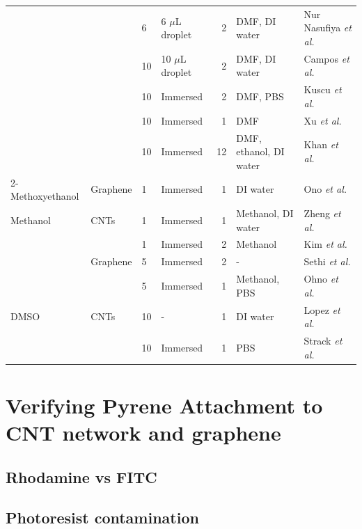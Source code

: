 \documentclass[
  a4paper,
]{scrbook}
\begin{document}
\begin{longtable}[]{@{}llllrll@{}}
& & 6 & 6 \(\mu\)L droplet & 2 & DMF, DI water & Nur Nasufiya
\textit{et al.} \cite{NurNasyifa2020} \\
& & 10 & 10 \(\mu\)L droplet & 2 & DMF, DI water & Campos
\textit{et al.} \cite{Campos2019} \\
& & 10 & Immersed & 2 & DMF, PBS & Kuscu \textit{et al.}
\cite{Kuscu2020} \\
& & 10 & Immersed & 1 & DMF & Xu \textit{et al.} \cite{Xu2017} \\
& & 10 & Immersed & 12 & DMF, ethanol, DI water & Khan \textit{et al.}
\cite{Khan2020} \\
2-Methoxyethanol & Graphene & 1 & Immersed & 1 & DI water & Ono
\textit{et al.} \cite{Ono2020} \\
Methanol & CNTs & 1 & Immersed & 1 & Methanol, DI water & Zheng
\textit{et al.} \cite{Zheng2016} \\
& & 1 & Immersed & 2 & Methanol & Kim \textit{et al.} \cite{Kim2009} \\
& Graphene & 5 & Immersed & 2 & - & Sethi \textit{et al.}
\cite{Sethi2020} \\
& & 5 & Immersed & 1 & Methanol, PBS & Ohno \textit{et al.}
\cite{Ohno2010} \\
DMSO & CNTs & 10 & - & 1 & DI water & Lopez \textit{et al.}
\cite{Lopez2015} \\
& & 10 & Immersed & 1 & PBS & Strack \textit{et al.}
\cite{Strack2013} \\
\bottomrule()
\end{longtable}

\newpage
{}

\hypertarget{verifying-pyrene-attachment-to-cnt-network-and-graphene}{%
\section{Verifying Pyrene Attachment to CNT network and
graphene}\label{verifying-pyrene-attachment-to-cnt-network-and-graphene}}

\hypertarget{rhodamine-vs-fitc}{%
\subsection{Rhodamine vs FITC}\label{rhodamine-vs-fitc}}

\hypertarget{sec-photoresist-contamination}{%
\subsection{Photoresist
contamination}\label{sec-photoresist-contamination}}
\end{document}
